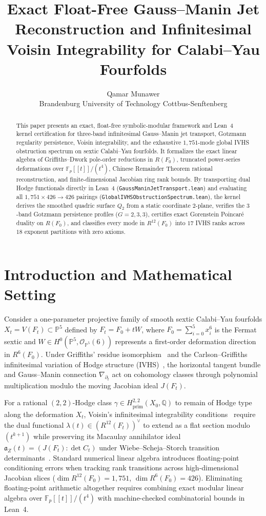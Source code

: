 \documentclass[11pt,a4paper]{article}
\title{\textbf{Exact Float-Free Gauss--Manin Jet Reconstruction and Infinitesimal Voisin Integrability for Calabi--Yau Fourfolds}}
\author{Qamar Munawer \\ Brandenburg University of Technology Cottbus-Senftenberg}
\date{}
\begin{document}
\maketitle

\begin{abstract}
This paper presents an exact, float-free symbolic-modular framework and Lean~4 kernel certification for three-band infinitesimal Gauss--Manin jet transport, Gotzmann regularity persistence, Voisin integrability, and the exhaustive $1{,}751$-mode global IVHS obstruction spectrum on sextic Calabi--Yau fourfolds. It formalizes the exact linear algebra of Griffiths--Dwork pole-order reductions in $R(F_0)$, truncated power-series deformations over $\mathbb{F}_p[[t]]/(t^4)$, Chinese Remainder Theorem rational reconstruction, and finite-dimensional Jacobian ring rank bounds. By transporting dual Hodge functionals directly in Lean~4 (\texttt{GaussManinJetTransport.lean}) and evaluating all $1{,}751 \times 426 \to 426$ pairings (\texttt{GlobalIVHSObstructionSpectrum.lean}), the kernel derives the smoothed quadric surface $Q_2$ from a static coordinate $2$-plane, verifies the $3$-band Gotzmann persistence profiles ($G=2,3,3$), certifies exact Gorenstein Poincar\'e duality on $R(F_0)$, and classifies every mode in $R^{12}(F_0)$ into $17$ IVHS ranks across $18$ exponent partitions with zero axioms.
\end{abstract}

\section{Introduction and Mathematical Setting}

Consider a one-parameter projective family of smooth sextic Calabi--Yau fourfolds $X_t = V(F_t) \subset \mathbb{P}^5$ defined by $F_t = F_0 + t W$, where $F_0 = \sum_{i=0}^5 x_i^6$ is the Fermat sextic and $W \in H^0(\mathbb{P}^5, \mathcal{O}_{\mathbb{P}^5}(6))$ represents a first-order deformation direction in $R^6(F_0)$. Under Griffiths' residue isomorphism~\cite{Griffiths1969} and the Carlson--Griffiths infinitesimal variation of Hodge structure (IVHS)~\cite{CarlsonGriffiths1980}, the horizontal tangent bundle and Gauss--Manin connection $\nabla_{\partial_t}$ act on cohomology classes through polynomial multiplication modulo the moving Jacobian ideal $J(F_t)$.

For a rational $(2,2)$-Hodge class $\gamma \in H^{2,2}_{\mathrm{prim}}(X_0, \mathbb{Q})$ to remain of Hodge type along the deformation $X_t$, Voisin's infinitesimal integrability conditions~\cite{Voisin2002} require the dual functional $\lambda(t) \in (R^{12}(F_t))^\vee$ to extend as a flat section modulo $(t^{k+1})$ while preserving its Macaulay annihilator ideal $\mathfrak{a}_Z(t) = (J(F_t) : \det C_t)$ under Wiebe--Scheja--Storch transition determinants~\cite{SchejaStorch1975}. Standard numerical linear algebra introduces floating-point conditioning errors when tracking rank transitions across high-dimensional Jacobian slices ($\dim R^{12}(F_0) = 1{,}751$, $\dim R^6(F_0) = 426$). Eliminating floating-point arithmetic altogether requires combining exact modular linear algebra over $\mathbb{F}_p[[t]]/(t^4)$ with machine-checked combinatorial bounds in Lean~4.
\end{document}
